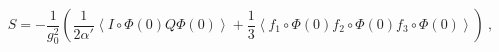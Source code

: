 \begin{equation}\label{actionCFT}
S=-\frac{1}{g_0^2}\left(
\frac{1}{2\alpha'}\left<I\circ \Phi (0) Q \Phi (0)\right>+
\frac{1}{3}\left<f_1\circ \Phi(0) f_2\circ \Phi(0)
f_3\circ \Phi(0)\right>\right) \ ,
\end{equation}

